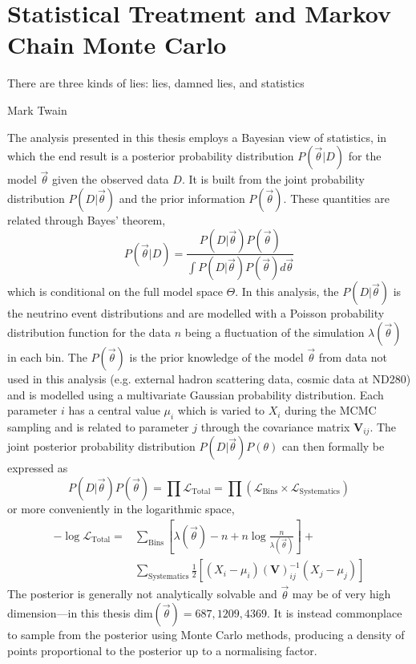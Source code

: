 \chapter{Statistical Treatment and Markov Chain Monte Carlo}
\label{chap:mcmc}

\epigraph{There are three kinds of lies: lies, damned lies, and statistics}{Mark Twain}

The analysis presented in this thesis employs a Bayesian view of statistics, in which the end result is a posterior probability distribution $P(\vec{\theta}|D)$ for the model $\vec{\theta}$ given the observed data $D$. It is built from the joint probability distribution $P(D|\vec{\theta})$ and the prior information $P(\vec{\theta})$. These quantities are related through Bayes' theorem,
\begin{equation}
P(\vec{\theta}|D) = \frac{P(D|\vec{\theta})P(\vec{\theta})}{\int P(D|\vec{\theta})P(\vec{\theta})d\vec{\theta}}
\label{eq:bayes}
\end{equation}
which is conditional on the full model space $\Theta$. In this analysis, the $P(D|\vec{\theta})$ is the neutrino event distributions and are modelled with a Poisson probability distribution function for the data $n$ being a fluctuation of the simulation $\lambda(\vec{\theta})$ in each bin. The $P(\vec{\theta})$ is the prior knowledge of the model $\vec{\theta}$ from data not used in this analysis (e.g. external hadron scattering data, cosmic data at ND280) and is modelled using a multivariate Gaussian probability distribution. Each parameter $i$ has a central value $\mu_i$ which is varied to $X_i$ during the MCMC sampling and is related to parameter $j$ through the covariance matrix $\mathbf{V}_{ij}$. The joint posterior probability distribution $P(D|\vec{\theta})P(\theta)$ can then formally be expressed as
\begin{equation}
	P(D|\vec{\theta}) P(\vec{\theta}) = \prod \mathcal{L}_\text{Total} = \prod \left(\mathcal{L}_\text{Bins} \times \mathcal{L}_\text{Systematics}\right)
\end{equation}
or more conveniently in the logarithmic space,
\begin{equation}
\label{eq:test_stat}
\begin{split}
	- \log\mathcal{L}_\text{Total} = &\sum_\text{Bins} \left[ \lambda(\vec{\theta}) - n + n \log \frac{n}{\lambda(\vec{\theta})} \right] + \\
									& \sum_\text{Systematics} \frac{1}{2} \left[ ( X_i - \mu_i ) \left( \boldsymbol{V} \right)^{-1}_{ij} ( X_j - \mu_j ) \right]
\end{split}
\end{equation}
The posterior is generally not analytically solvable and $\vec{\theta}$ may be of very high dimension---in this thesis $\text{dim}(\vec{\theta})=687, 1209, 4369$. It is instead commonplace to sample from the posterior using Monte Carlo methods, producing a density of points proportional to the posterior up to a normalising factor.


